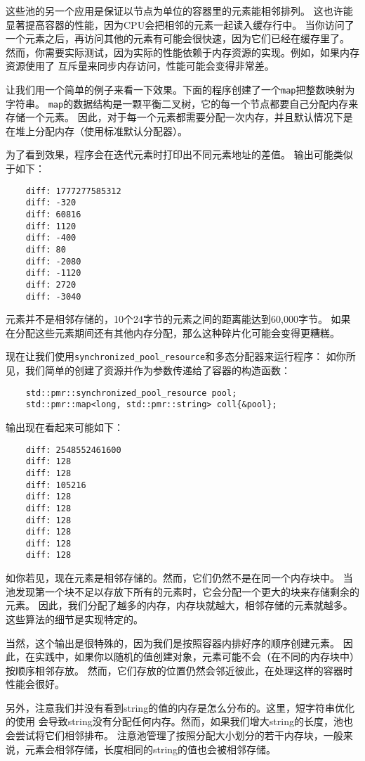 这些池的另一个应用是保证以节点为单位的容器里的元素能相邻排列。
这也许能显著提高容器的性能，因为CPU会把相邻的元素一起读入缓存行中。
当你访问了一个元素之后，再访问其他的元素有可能会很快速，因为它们已经在缓存里了。
然而，你需要实际测试，因为实际的性能依赖于内存资源的实现。例如，如果内存资源使用了
互斥量来同步内存访问，性能可能会变得非常差。

让我们用一个简单的例子来看一下效果。下面的程序创建了一个\texttt{map}把整数映射为字符串。
\texttt{map}的数据结构是一颗平衡二叉树，它的每一个节点都要自己分配内存来存储一个元素。
因此，对于每一个元素都需要分配一次内存，并且默认情况下是在堆上分配内存（使用标准默认分配器）。

为了看到效果，程序会在迭代元素时打印出不同元素地址的差值。
输出可能类似于如下：
\begin{lstlisting}
    diff: 1777277585312
    diff: -320
    diff: 60816
    diff: 1120
    diff: -400
    diff: 80
    diff: -2080
    diff: -1120
    diff: 2720
    diff: -3040
\end{lstlisting}
元素并不是相邻存储的，10个24字节的元素之间的距离能达到60,000字节。
如果在分配这些元素期间还有其他内存分配，那么这种碎片化可能会变得更糟糕。

现在让我们使用\texttt{synchronized\_pool\_resource}和多态分配器来运行程序：
如你所见，我们简单的创建了资源并作为参数传递给了容器的构造函数：
\begin{lstlisting}
    std::pmr::synchronized_pool_resource pool;
    std::pmr::map<long, std::pmr::string> coll{&pool};
\end{lstlisting}
输出现在看起来可能如下：
\begin{lstlisting}
    diff: 2548552461600
    diff: 128
    diff: 128
    diff: 105216
    diff: 128
    diff: 128
    diff: 128
    diff: 128
    diff: 128
    diff: 128
\end{lstlisting}
如你若见，现在元素是相邻存储的。然而，它们仍然不是在同一个内存块中。
当池发现第一个块不足以存放下所有的元素时，它会分配一个更大的块来存储剩余的元素。
因此，我们分配了越多的内存，内存块就越大，相邻存储的元素就越多。
这些算法的细节是实现特定的。

当然，这个输出是很特殊的，因为我们是按照容器内排好序的顺序创建元素。
因此，在实践中，如果你以随机的值创建对象，元素可能不会（在不同的内存块中）按顺序相邻存放。
然而，它们存放的位置仍然会邻近彼此，在处理这样的容器时性能会很好。

另外，注意我们并没有看到string的值的内存是怎么分布的。这里，短字符串优化的使用
会导致string没有分配任何内存。然而，如果我们增大string的长度，池也会尝试将它们相邻排布。
注意池管理了按照分配大小划分的若干内存块，一般来说，元素会相邻存储，长度相同的string的值也会被相邻存储。

